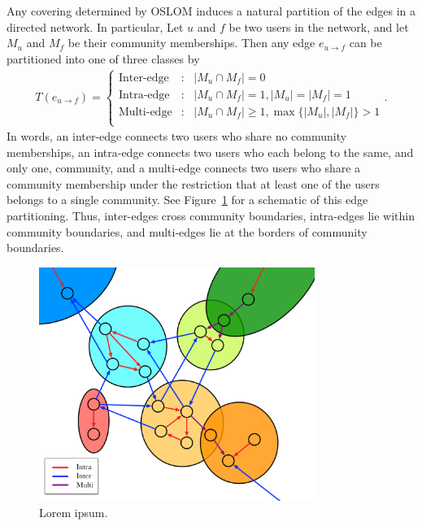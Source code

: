 Any covering determined by OSLOM induces a natural partition of the edges in a directed network. In particular, Let $u$ and $f$ be two users in the network, and let $M_{u}$ and $M_{f}$ be their community memberships. Then any edge $e_{u \to f}$ can be partitioned into one of three classes by
\begin{align}
	T(e_{u \to f}) = \left\{ \begin{array}{ll}
		\text{Inter-edge} &: \ \ \ |M_{u} \cap M_{f}| = 0 \\
		\text{Intra-edge} &: \ \ \ |M_{u} \cap M_{f}| = 1, |M_{u}| = |M_{f}| = 1 \\
		\text{Multi-edge} &: \ \ \ |M_{u} \cap M_{f}| \geq 1, \max \{|M_{u}|, |M_{f}| \} > 1 \\
	\end{array}\right. \label{Eqn-edge_types}.
\end{align}
In words, an inter-edge connects two users who share no community memberships, an intra-edge connects two users who each belong to the same, and only one, community, and a multi-edge connects two users who share a community membership under the restriction that at least one of the users belongs to a single community. See Figure~\ref{Fig-edge_types} for a schematic of this edge partitioning. Thus, inter-edges cross community boundaries, intra-edges lie within community boundaries, and multi-edges lie at the borders of community boundaries.

\begin{figure}[!h]
	\centering
	\includegraphics[width=0.8\textwidth]{edge-types.pdf}
	\caption{Lorem ipsum.}
	\label{Fig-edge_types}
\end{figure}

